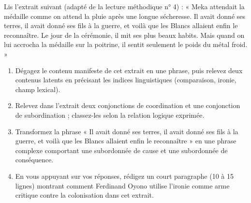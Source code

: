 \documentclass[11pt]{article}
\begin{document}
\begin{exercice}
Lis l'extrait suivant (adapté de la lecture méthodique n° 4) : « Meka attendait la médaille comme on attend la pluie après une longue sécheresse. Il avait donné ses terres, il avait donné ses fils à la guerre, et voilà que les Blancs allaient enfin le reconnaître. Le jour de la cérémonie, il mit ses plus beaux habits. Mais quand on lui accrocha la médaille sur la poitrine, il sentit seulement le poids du métal froid. »
\begin{enumerate}
\item Dégagez le contenu manifeste de cet extrait en une phrase, puis relevez deux contenus latents en précisant les indices linguistiques (comparaison, ironie, champ lexical).
\item Relevez dans l'extrait deux conjonctions de coordination et une conjonction de subordination ; classez-les selon la relation logique exprimée.
\item Transformez la phrase « Il avait donné ses terres, il avait donné ses fils à la guerre, et voilà que les Blancs allaient enfin le reconnaître » en une phrase complexe comportant une subordonnée de cause et une subordonnée de conséquence.
\item En vous appuyant sur vos réponses, rédigez un court paragraphe (10 à 15 lignes) montrant comment Ferdinand Oyono utilise l'ironie comme arme critique contre la colonisation dans cet extrait.
\end{enumerate}
\end{exercice}
\end{document}
